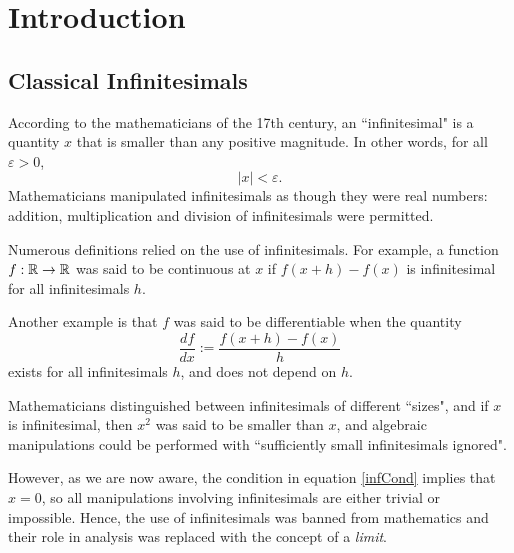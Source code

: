
\chapter{Introduction} %

\label{Chapter1} %



\section{Classical Infinitesimals}
According to the mathematicians of the 17th century, an ``infinitesimal"
is a quantity $x$ that is smaller than any positive magnitude. In other
words, for all $\varepsilon > 0$, 
\begin{equation}
\label{infCond}
    |x| < \varepsilon.
\end{equation}
Mathematicians manipulated infinitesimals
as though they were real numbers: addition, multiplication and division of infinitesimals
were permitted. 

Numerous definitions relied on the use of infinitesimals. For example,
a function $f:\mathbb{R}\rightarrow \mathbb{R}$ was said to be continuous at $x$
if $f(x+h)-f(x)$ is infinitesimal for all infinitesimals $h$.

Another example is that $f$ was said to be differentiable when the quantity
\begin{equation}
    \frac{df}{dx} := \frac{f(x+h)-f(x)}{h}
\end{equation}
exists for all infinitesimals $h$, and does not depend on $h$.

Mathematicians distinguished between infinitesimals of different ``sizes", 
and if $x$ is infinitesimal, then $x^2$ was said to be smaller than $x$,
and algebraic manipulations could be performed with ``sufficiently small
infinitesimals ignored".

However, as we are now aware, the condition in equation \ref{infCond} implies that $x = 0$, 
so all manipulations involving infinitesimals
are either trivial or impossible. Hence, the use 
of infinitesimals was banned from mathematics and their role
in analysis was replaced with the concept of a \emph{limit}.

